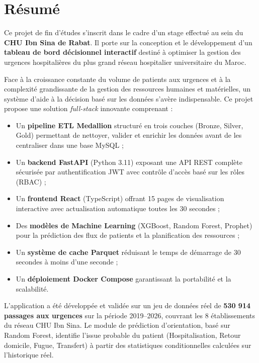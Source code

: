 \documentclass[12pt,a4paper]{report}
\begin{document}
	\chapter*{Résumé}
	
	Ce projet de fin d'études s'inscrit dans le cadre d'un stage effectué au sein du
	\textbf{CHU Ibn Sina de Rabat}. Il porte sur la conception et le développement d'un
	\textbf{tableau de bord décisionnel interactif} destiné à optimiser la gestion des urgences
	hospitalières du plus grand réseau hospitalier universitaire du Maroc.
	
	Face à la croissance constante du volume de patients aux urgences et à la complexité
	grandissante de la gestion des ressources humaines et matérielles, un système d'aide à la
	décision basé sur les données s'avère indispensable. Ce projet propose une solution
	\textit{full-stack} innovante comprenant :
	
	\begin{itemize}[leftmargin=1.5cm]
		\item Un \textbf{pipeline ETL Medallion} structuré en trois couches (Bronze, Silver, Gold)
		permettant de nettoyer, valider et enrichir les données avant de les centraliser dans
		une base MySQL ;
		\item Un \textbf{backend FastAPI} (Python 3.11) exposant une API REST complète sécurisée
		par authentification JWT avec contrôle d'accès basé sur les rôles (RBAC) ;
		\item Un \textbf{frontend React} (TypeScript) offrant 15 pages de visualisation interactive
		avec actualisation automatique toutes les 30 secondes ;
		\item Des \textbf{modèles de Machine Learning} (XGBoost, Random Forest, Prophet) pour la
		prédiction des flux de patients et la planification des ressources ;
		\item Un \textbf{système de cache Parquet} réduisant le temps de démarrage de 30 secondes
		à moins d'une seconde ;
		\item Un \textbf{déploiement Docker Compose} garantissant la portabilité et la scalabilité.
	\end{itemize}
	
	L'application a été développée et validée sur un jeu de données réel de
	\textbf{530 914 passages aux urgences} sur la période 2019--2026, couvrant les 8 établissements
	du réseau CHU Ibn Sina. Le module de prédiction d'orientation, basé sur Random Forest,
	identifie l'issue probable du patient (Hospitalisation, Retour domicile, Fugue, Transfert)
	à partir des statistiques conditionnelles calculées sur l'historique réel.
	
\end{document}
